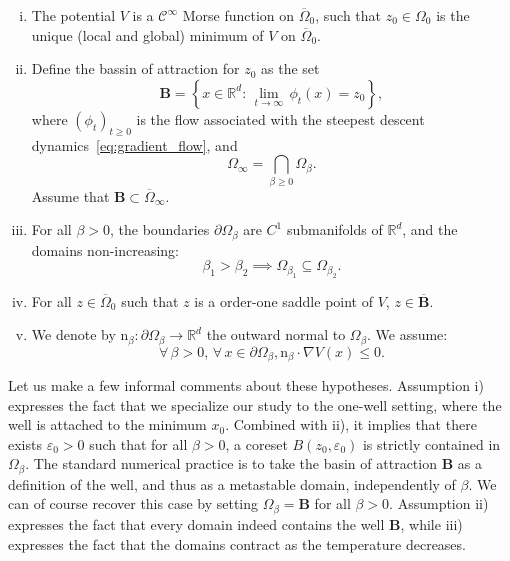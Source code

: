 \documentclass[10pt]{article}
\newcommand{\R}{\mathbb{R}}
\newcommand{\1}{\mathbbm 1}
\begin{document}
    \begin{enumerate}[i)]
        \item{The potential $V$ is a $\mathcal C^\infty$ Morse function on $\overline{\Omega}_0$, such that $z_0 \in \Omega_0$ is the unique (local and global) minimum of $V$ on $\overline{\Omega}_0$.}
        \item{Define the bassin of attraction for $z_0$ as the set
        \begin{equation}
            \label{eq:basin}
            \mathbf{B} = \left\{ x \in \R^d:\,\underset{t\to\infty}{\lim}\,\phi_t(x) = z_0\right\},
        \end{equation}
        where $(\phi_t)_{t\geq 0}$ is the flow associated with the steepest descent dynamics~\eqref{eq:gradient_flow},
        and 
        $$ \Omega_\infty = \bigcap_{\beta\geq 0}\Omega_\beta.$$
        Assume that $\mathbf{B} \subset \overline{\Omega}_\infty$.
        }
        \item{For all $\beta>0$, the boundaries $\partial \Omega_\beta$ are $C^1$ submanifolds of $\R^d$, and the domains non-increasing: \[\beta_1 > \beta_2 \implies \Omega_{\beta_1} \subseteq \Omega_{\beta_2}.\] }
        \item{For all $z\in\overline{\Omega}_0$ such that $z$ is a order-one saddle point of $V$, $z\in\overline{\mathbf{B}}$.}
        \item{We denote by $\mathrm{n}_{\beta}: \partial \Omega_\beta \to \R^d$ the outward normal to $\Omega_\beta$. We assume:
        \begin{equation}\forall\,\beta>0,\,\forall\,x \in \partial\Omega_\beta, \mathrm{n}_{\beta}\cdot \nabla V (x) \leq 0.\end{equation} }
    \end{enumerate}
    Let us make a few informal comments about these hypotheses. Assumption i) expresses the fact that we specialize our study to the one-well setting, where the well is attached to the minimum $x_0$.
    Combined with ii), it implies that there exists $\varepsilon_0>0$ such that for all $\beta>0$, a coreset $B(z_0,\varepsilon_0)$ is strictly contained in $\Omega_\beta$. 
    The standard numerical practice is to take the basin of attraction $\mathbf{B}$ as a definition of the well, and thus as a metastable domain, independently of $\beta$. We can of course recover this case by setting $\Omega_\beta = \mathbf B$ for all $\beta>0$.
    Assumption ii) expresses the fact that every domain indeed contains the well $\mathbf{B}$, while iii) expresses the fact that the domains contract as the temperature decreases.
\end{document}
